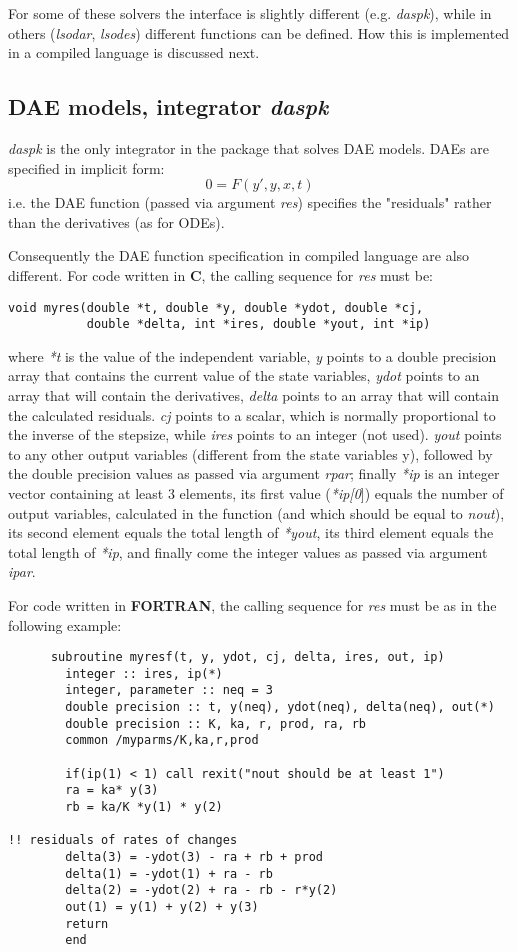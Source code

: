 \documentclass[english]{article}
\newcommand{\FOR}{\textbf{\textsf{FORTRAN}}\xspace}
\newcommand{\C}{\textbf{\textsf{C}}\xspace}
\begin{document}
For some of these solvers the interface is slightly different (e.g. \emph{daspk}), while
in others (\emph{lsodar}, \emph{lsodes}) different functions can be defined.
How this is implemented in a compiled language is discussed next.

\subsection{DAE models, integrator \emph{daspk}}
\emph{daspk} is the only integrator in the package that solves DAE models.
DAEs are specified in implicit form:
\[0 = F(y',y,x,t)\]
i.e. the DAE function (passed via argument \emph{res}) specifies the "residuals"
rather than the derivatives (as for ODEs).

Consequently the DAE function specification in compiled language are also different.
For code written in \C, the calling sequence for \emph{res} must be:

\begin{verbatim}
void myres(double *t, double *y, double *ydot, double *cj,
           double *delta, int *ires, double *yout, int *ip)
\end{verbatim}
where \emph{*t} is the value of the independent variable, \emph{y}
points to a double precision array that contains the current value
of the state variables, \emph{ydot} points to an array that will
contain the derivatives, \emph{delta} points to an array that will
contain the calculated residuals. \emph{cj} points to a scalar,
which is normally proportional to the inverse of the stepsize,
while \emph{ires} points to an integer (not used). \emph{yout}
points to any other output variables (different from the state
variables y), followed by the double precision values as passed
via argument \emph{rpar}; finally \emph{*ip} is an integer vector
containing at least 3 elements, its first value (\emph{*ip[0}])
equals the number of output variables, calculated in the function
 (and which should be equal to \emph{nout}), its second element equals the total length of \emph{*yout},
 its third element equals the total length of \emph{*ip}, and finally come the integer values as
 passed via argument \emph{ipar}.

For code written in \FOR, the calling sequence for \emph{res} must be as in the following example:

\begin{verbatim}
      subroutine myresf(t, y, ydot, cj, delta, ires, out, ip)
        integer :: ires, ip(*)
        integer, parameter :: neq = 3
        double precision :: t, y(neq), ydot(neq), delta(neq), out(*)
        double precision :: K, ka, r, prod, ra, rb
        common /myparms/K,ka,r,prod

        if(ip(1) < 1) call rexit("nout should be at least 1")
        ra = ka* y(3)
        rb = ka/K *y(1) * y(2)

!! residuals of rates of changes
        delta(3) = -ydot(3) - ra + rb + prod
        delta(1) = -ydot(1) + ra - rb
        delta(2) = -ydot(2) + ra - rb - r*y(2)
        out(1) = y(1) + y(2) + y(3)
        return
        end
\end{verbatim}
\end{document}
